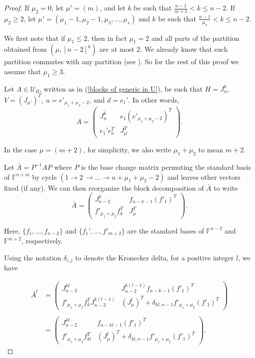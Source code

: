 \documentclass[10pt,a4paper]{amsart}
\newcommand{\U}{\mathcal{U}}
\begin{document}
\begin{proof}
If $\mu_2=0$, let $\mu'=(m)$, and let $k$ be such that $\frac{n-1}{m+1}< k \leq n-2$. If $\mu_2\geq 2$, let $\mu'=(\mu_1-1, \mu_2-1, \mu_3, \ldots, \mu_s)$ and  $k$ be such that $\frac{n-1}{\mu_2}< k \leq n-2$.

We first note that if $\mu_1\leq 2$, then in fact $\mu_1=2$ and all parts of the partition obtained from $\left(\mu, [n-2]^k\right)$ are at most 2. We already know that such partition commutes with any partition (see \cite[Thm. 2.4]{Obl-3}). So for the rest of this proof we assume that $\mu_1\geq 3$. 

Let $A\in \U_B$, written as in (\ref{blocks of generic in U}), be such that  $H=J_n^k$, $V=\left(J_{\mu'}\right)^T$, $u=e'_{\mu_1+\mu_2-2}$, and $d=e_1'$. 
In other words, 
 \[A=\left( 
\begin{array}{c|c}
  J_n^k  & e_1\left(e'_{\mu_1+\mu_2-2}\right)^T \\
  \hline
  e_1'e_n^T   & J_{\mu'}^T
\end{array}
\right).\]

In the case $\mu=(m+2)$, for simplicity, we also write $\mu_1+\mu_2$ to mean $m+2$. 

Let $\bar{A}=P^{-1}AP$ where $P$ is the base change matrix permuting the standard basis of $\mathbb{F}^{n+m}$ by cycle  $(1\to 2\, \to \ldots \to n+\mu_1+\mu_2-2)$ and leaves other vectors fixed (if any). We can then reorganize the block decomposition of $\bar{A}$ to write 
\[\bar{A}= 
\left( 
\begin{array}{c|c}
  J_{n-2}^k & f_{n-k-1}\left(f'_1\right)^T \\
 \hline
  f'_{\mu_1+\mu_2}f_k^T & J_\mu^T
\end{array}
\right).\]

Here, $\{f_1, \ldots, f_{n-2}\}$ and $\{f_1', \ldots,f'_{m+2}\}$ are the standard bases of $\mathbb{F}^{n-2}$ and $\mathbb{F}^{m+2}$, respectively. 

Using the notation $\delta_{i,j}$ to denote the Kronecker delta, for a positive integer $l$, we have 

\[\begin{array}{ll}
\bar{A}^l&= 
\left( 
\begin{array}{c|c}
  J_{n-2}^{kl} & J_{n-2}^{k(l-1)}f_{n-k-1}\left(f'_1\right)^T \\
 \hline
  f'_{\mu_1+\mu_2}f_k^TJ_{n-2}^{k(l-1)}& \left(J^l_\mu\right)^T +\delta_{kl,n-1}f'_{\mu_1+\mu_2}(f'_1)^T
\end{array}
\right)
\\ \\
&=
\left( 
\begin{array}{c|c}
  J_{n-2}^{kl} &f_{n-kl-1}\left(f'_1\right)^T \\
 \hline
  f'_{\mu_1+\mu_2}f_{kl}^T& \left(J^l_\mu\right)^T +\delta_{kl,n-1}f'_{\mu_1+\mu_2}(f'_1)^T
\end{array}
\right).
\end{array}\]


\end{proof}
\end{document}
